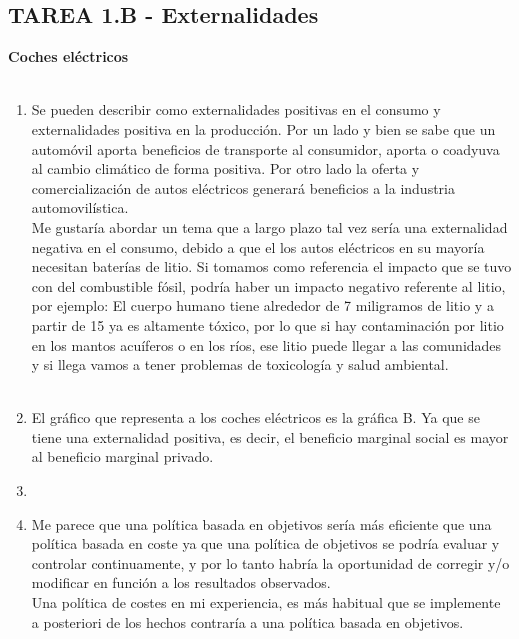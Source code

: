 \subsection*{\center TAREA 1.B - Externalidades}
\vspace{1cm}
\textbf{Coches eléctricos}\\\\
\begin{enumerate}

    \item Se pueden describir como externalidades positivas en el consumo y externalidades positiva en la producción. Por un lado y bien se sabe que un automóvil aporta beneficios de transporte al consumidor, aporta o coadyuva al cambio climático de forma positiva. Por otro lado la oferta y comercialización de autos eléctricos generará beneficios a la industria automovilística.\\
    Me gustaría abordar un tema que a largo plazo tal vez sería una externalidad negativa en el consumo, debido a que el los autos eléctricos en su mayoría necesitan baterías de litio. Si tomamos como referencia el impacto que se tuvo con del combustible fósil, podría haber un impacto negativo  referente al litio, por ejemplo: El cuerpo humano tiene alrededor de 7 miligramos de litio y a partir de 15 ya es altamente tóxico, por lo que si hay contaminación por litio en los mantos acuíferos o en los ríos, ese litio puede llegar a las comunidades y si llega vamos a tener problemas de toxicología y salud ambiental.\\\\

    \item El gráfico que representa a los coches eléctricos es la gráfica B. Ya que se tiene una externalidad positiva, es decir, el beneficio marginal social es mayor al beneficio marginal privado.\\

    \item	

    \item Me parece que una política basada en objetivos sería más eficiente que una política basada en coste ya que una política de objetivos se podría evaluar y controlar continuamente, y por lo tanto habría la oportunidad de corregir y/o modificar en función a los resultados observados.\\
    Una política de costes en mi experiencia, es más habitual que se implemente a posteriori de los hechos contraría a una política basada en objetivos.\\\\  

\end{enumerate}
